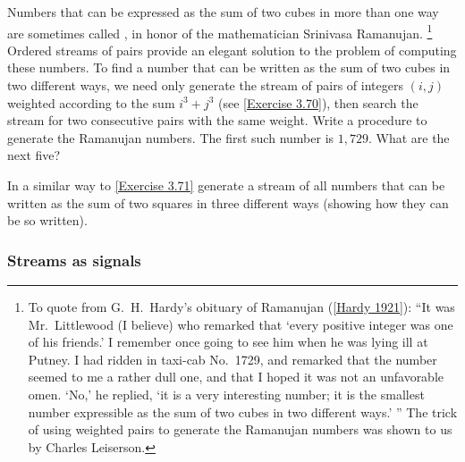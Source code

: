 \begin{exercise}
	\label{Exercise 3.71}
	Numbers that can be expressed as the sum of two cubes in more than one way are sometimes called , in honor of the mathematician Srinivasa Ramanujan.%
	\footnote{
		To quote from G.~H.~Hardy’s obituary of Ramanujan (\cref{Hardy 1921}):
		“It was Mr.~Littlewood (I believe) who remarked that ‘every positive integer was one of his friends.’  I remember once going to see him when he was lying ill at Putney.
		I had ridden in taxi-cab No.~1729, and remarked that the number seemed to me a rather dull one, and that I hoped it was not an unfavorable omen.
		‘No,’ he replied, ‘it is a very interesting number;
		it is the smallest number expressible as the sum of two cubes in two different ways.’ ”
		The trick of using weighted pairs to generate the Ramanujan numbers was shown to us by Charles Leiserson.
	}
	Ordered streams of pairs provide an elegant solution to the problem of computing these numbers.
	To find a number that can be written as the sum of two cubes in two different ways, we need only generate the stream of pairs of integers \( (i, j) \) weighted according to the sum \( i^3 + j^3 \) (see \cref{Exercise 3.70}), then search the stream for two consecutive pairs with the same weight.
	Write a procedure to generate the Ramanujan numbers.
	The first such number is \( 1,729 \).
	What are the next five?
\end{exercise}



\begin{exercise}
	\label{Exercise 3.72}
	In a similar way to \cref{Exercise 3.71} generate a stream of all numbers that can be written as the sum of two squares in three different ways (showing how they can be so written).
\end{exercise}



\subsubsection*{Streams as signals}


